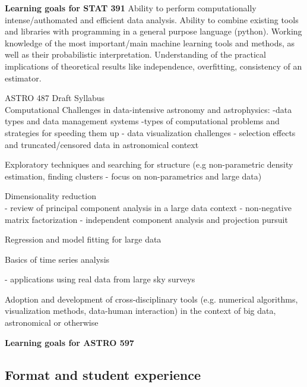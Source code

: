 \item[]{\bf Learning goals for STAT 391} Ability to perform computationally intense/authomated and efficient data analysis. Ability to combine existing tools and libraries with programming in a general purpose language (python). 
Working knowledge of the most important/main machine learning tools and methods, as well as their probabilistic interpretation. Understanding of the practical implications of theoretical results like independence, overfitting, consistency of an estimator. 

\item ASTRO 487 Draft Syllabus\\
Computational Challenges in data-intensive astronomy and astrophysics:
-data types and data management systems
-types of computational problems and strategies for speeding them up 
- data visualization challenges
- selection effects and truncated/censored data in astronomical context 

Exploratory techniques and searching for structure (e.g non-parametric density estimation, finding clusters - focus on non-parametrics and large data)

Dimensionality reduction\\
- review of principal component analysis in a large data context
- non-negative matrix factorization 
- independent component analysis and projection pursuit 

Regression and model fitting for large data

Basics of time series analysis

- applications using real data from large sky surveys

Adoption and development of cross-disciplinary tools (e.g. numerical 
algorithms, visualization methods, data-human interaction) in the context
of big data, astronomical or otherwise 
\eit

{\bf Learning goals for ASTRO 597}



\subsection{Format and student experience}

